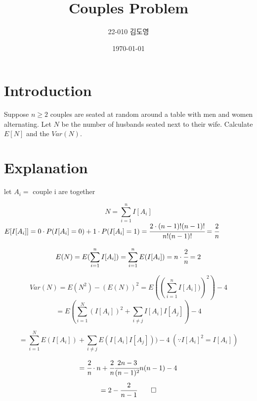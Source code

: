\documentclass{article}
\title{Couples Problem}
\author{22-010 김도영}
\date{\today}
\begin{document}
\maketitle

\section{Introduction}

Suppose $n \geq 2$ couples are seated at random around a table with men and women alternating. Let $N$ be the number of husbands seated next to their wife. Calculate $E[N]$ and the $Var(N)$.


\section{Explanation}
let $A_i = $ {couple i are together}

\[N = \sum_{i=1}^{n} I[A_i]
\]
$
E[I[A_i]] = 0 \cdot P(I[A_i]=0) +1 \cdot P(I[A_i]=1) = \cfrac{2\cdot (n-1)!(n-1)!}{n!(n-1)!}= \cfrac{2}{n}
$

\[
E(N) = E( \sum_{i=1}^{n} I[A_i])= \sum_{i=1}^{n} E(I[A_i]) = n \cdot \cfrac{2}{n} = 2
\]


\[
Var(N) = E(N^2) - (E(N))^2 = E\left(\left(\sum_{i=1}^{n} I[A_i])\right)^2\right)-4
\]
\[
= E\left(\sum_{i=1}^{N} (I[A_i])^2+ \sum_{i \neq j} I[A_i]I[A_j]  \right)-4
\]

\[
= \sum_{i=1}^{N} E(I[A_i])+ \sum_{i \neq j} E(I[A_i]I[A_j])  )-4 \; (\because I[A_i]^2 = I[A_i])
\]

\[
= \cfrac{2}{n} \cdot n + \cfrac{2}{n} \cfrac{2n-3}{(n-1)^2} n(n-1) -4
\]
\[
= 2 - \cfrac{2}{n-1} \qed
\]
\end{document}
